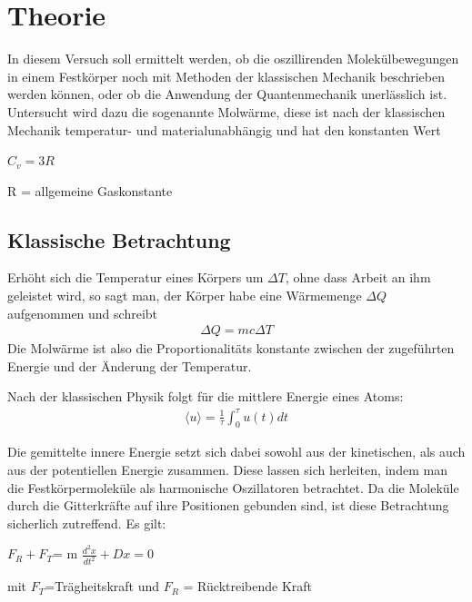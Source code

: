 

\section{Theorie}
In diesem Versuch soll ermittelt werden, ob die oszillirenden Molekülbewegungen in einem Festkörper noch mit Methoden der klassischen Mechanik beschrieben werden können, oder ob die Anwendung der Quantenmechanik unerlässlich ist. Untersucht wird dazu die sogenannte Molwärme, diese ist nach der klassischen Mechanik temperatur- und materialunabhängig und hat den konstanten Wert
\begin{formel}[H]
\centering
$C_v=3R$
\caption*{\small{R = allgemeine Gaskonstante}}
\end{formel}

\subsection{Klassische Betrachtung}
Erhöht sich die Temperatur eines Körpers um $\Delta T$, ohne dass Arbeit an ihm geleistet wird, so sagt man, der Körper habe eine Wärmemenge $\Delta Q$ aufgenommen und schreibt
\begin{align}
\Delta Q = mc \Delta T
\end{align}
Die Molwärme ist also die Proportionalitäts konstante zwischen der zugeführten Energie und der Änderung der Temperatur.

Nach der klassischen Physik folgt für die mittlere Energie eines Atoms:
\begin{align*}
\langle u\rangle = \frac{1}{\tau} \int^\tau_0 u(t) dt
\end{align*}

Die gemittelte innere Energie setzt sich dabei sowohl aus der kinetischen, als auch aus der potentiellen Energie zusammen.
Diese lassen sich herleiten, indem man die Festkörpermoleküle als harmonische Oszillatoren betrachtet. Da die Moleküle durch die Gitterkräfte auf ihre Positionen gebunden sind, ist diese Betrachtung sicherlich zutreffend. Es gilt:
\begin{formel}[H]
\centering
$F_R + F_T $= m $\frac{d^2x}{dt^2} + Dx  = 0$
\caption*{\small{mit
$F_T$=Trägheitskraft und $F_R$ = Rücktreibende Kraft}}
\end{formel}

